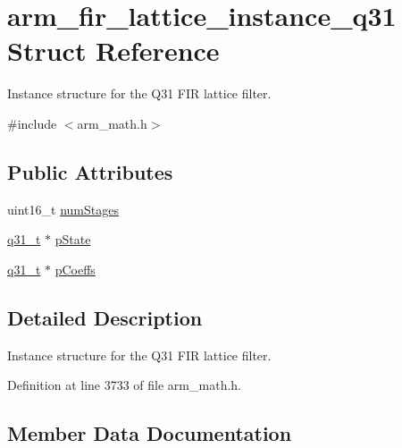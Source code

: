 \hypertarget{structarm__fir__lattice__instance__q31}{}\section{arm\+\_\+fir\+\_\+lattice\+\_\+instance\+\_\+q31 Struct Reference}
\label{structarm__fir__lattice__instance__q31}


Instance structure for the Q31 F\+IR lattice filter.  




{\ttfamily \#include $<$arm\+\_\+math.\+h$>$}

\subsection*{Public Attributes}
\begin{DoxyCompactItemize}
\item 
uint16\+\_\+t \hyperlink{structarm__fir__lattice__instance__q31_a9f3773bbb76bc5a8a5ee9d37786bf478}{num\+Stages}
\item 
\hyperlink{arm__math_8h_adc89a3547f5324b7b3b95adec3806bc0}{q31\+\_\+t} $\ast$ \hyperlink{structarm__fir__lattice__instance__q31_a08fe9494ab7cd336b791e9657adadcf6}{p\+State}
\item 
\hyperlink{arm__math_8h_adc89a3547f5324b7b3b95adec3806bc0}{q31\+\_\+t} $\ast$ \hyperlink{structarm__fir__lattice__instance__q31_a66c3364bf5863cd45e05f1652c3dc522}{p\+Coeffs}
\end{DoxyCompactItemize}


\subsection{Detailed Description}
Instance structure for the Q31 F\+IR lattice filter. 

Definition at line 3733 of file arm\+\_\+math.\+h.



\subsection{Member Data Documentation}
\mbox{\label{structarm__fir__lattice__instance__q31_a9f3773bbb76bc5a8a5ee9d37786bf478}} 
